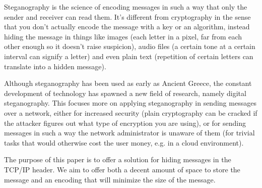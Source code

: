 
Steganography is the science of encoding messages in such a way that only the
sender and receiver can read them. It’s different from cryptography in the
sense that you don’t actually encode the message with a key or an algorithm,
instead hiding the message in things like images (each letter in a pixel, far
from each other enough so it doesn’t raise suspicion), audio files (a certain
tone at a certain interval can signify a letter) and even plain text
(repetition of certain letters can translate into a hidden message).

Although steganography has been used as early as Ancient Greece, the constant
development of technology has spawned a new field of research, namely digital
steganography. This focuses more on applying steganography in sending messages
over a network, either for increased security (plain cryptography can be
cracked if the attacker figures out what type of encryption you are using),
or for sending messages in such a way the network administrator is unaware
of them (for trivial tasks that would otherwise cost the user money, e.g. in a
cloud environment).

The purpose of this paper is to offer a solution for hiding messages in the
TCP/IP header. We aim to offer both a decent amount of space to store the
message and an encoding that will minimize the size of the message.
